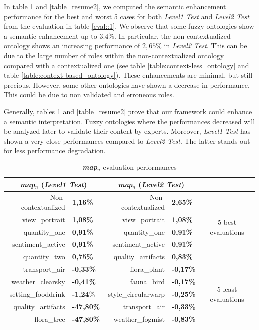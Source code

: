 		In table \ref{table_resume1} and \ref{table_resume2}, we computed the semantic 
		enhancement performance for the best and worst 5 cases for both \emph{Level1 Test} and \emph{Level2 Test}
		from the evaluation in table \ref{eval::1}. We observe that some fuzzy 
		ontologies show a semantic enhancement up to $3.4\%$. In particular, the non-contextualized
		ontology shows an increasing performance of $2,65\%$ in \emph{Level2 Test}. This can be due to 
		the large number of roles within the non-contextualized ontology compared with a contextualized one 
		(see table \ref{table:context-less_ontology} and table \ref{table:context-based_ontology}).
		These enhancements are minimal, but still precious. However, some other ontologies have shown a decrease in
		performance. This could be due to non validated and erroneous roles.
		
		Generally, tables \ref{table_resume1} and \ref{table_resume2} prove that our framework could enhance 
		a semantic interpretation. Fuzzy ontologies where the performances decreased will be analyzed later 
		to validate their content by experts. Moreover, \emph{Level1 Test} has shown a very close performances 
		compared to \emph{Level2 Test}. The latter stands out for less performance degradation.
		
		
		\begin{table}
	\centering	
	\caption{\textbf{\textit{map$_{n}$}} evaluation performances}
		\label{table_resume1}
		\begin{tabular}{rl rl c} 
			\hline
			
			\multicolumn{2}{c}{\textbf{\textit{map$_{n}$}} (\emph{Level1 Test})} & 
			\multicolumn{2}{c}{\textbf{\textit{map$_{n}$}} (\emph{Level2 Test})} & \\
			\hline  
			Non-contextualized & \textbf{1,16\%}&Non-contextualized &\textbf{2,65\%}& 
			\multirow{5}{*}{5 best evaluations}\\
			view\_portrait&\textbf{1,08\%}&view\_portrait&\textbf{1,08\%}& \\
			quantity\_one&\textbf{0,91\%}&quantity\_one&\textbf{0,91\%}& \\
			sentiment\_active&\textbf{0,91\%}&sentiment\_active&\textbf{0,91\%}& \\
			quantity\_two&\textbf{0,75\%}&quality\_artifacts&\textbf{0,83\%}& \\
			\hline
			transport\_air&\textbf{-0,33\%}&flora\_plant&\textbf{-0,17\%}& \multirow{5}{*}{5 least evaluations}\\
			weather\_clearsky&\textbf{-0,41\%}&fauna\_bird&\textbf{-0,17\%}& \\
			setting\_fooddrink&\textbf{-1,24}\%&style\_circularwarp&\textbf{-0,25\%}& \\
			quality\_artifacts&\textbf{-47,80\%}&transport\_air&\textbf{-0,33\%}& \\
			flora\_tree&\textbf{-47,80\%}&weather\_fogmist&\textbf{-0,83\%}& \\
			\hline 
\end{tabular}
\end{table}

